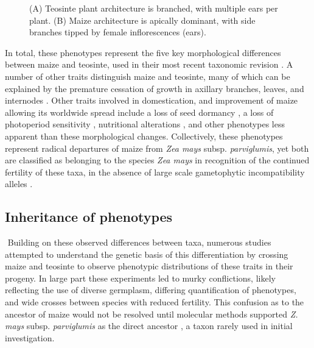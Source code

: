 \documentclass[a4paper]{article}
\newcommand{\mcs}[1]{\todo[size=\tiny, color=magenta!20]{#1}}
\begin{document}
   \begin{figure}
        \caption{\label{fig:provance} (A) Teosinte plant architecture is branched, with multiple ears per plant. (B) Maize architecture is apically dominant, with side branches tipped by female inflorescences (ears). }
\end{figure}



﻿In total, these phenotypes represent the five key morphological differences between maize and teosinte, used in their most recent taxonomic revision \citep{doebley1980, iltis1980}.
A number of other traits distinguish maize and teosinte, many of which can be explained by the premature cessation of growth in axillary branches, leaves, and internodes \citep{doebley1980}.
Other traits involved in domestication, and improvement of maize allowing its worldwide spread include a loss of seed dormancy \citep{avendanolopez2011}, a loss of photoperiod sensitivity \citep{huang2017}, nutritional alterations \citep{hanson1996, whitt2002}, and other phenotypes less apparent than these morphological changes. %
Collectively, these phenotypes represent radical departures of maize from \textit{Zea mays} subsp. \textit{parviglumis}, yet both are classified as belonging to the species \textit{Zea mays} in recognition of the continued fertility of these taxa, in the absence of large scale gametophytic incompatibility alleles \citep{kermicle2006}.


\subsection*{Inheritance of phenotypes}

﻿
﻿Building on these observed differences between taxa, numerous studies attempted to understand the genetic basis of this differentiation by crossing maize and teosinte to observe phenotypic distributions of these traits in their progeny.
In large part these experiments led to murky conflictions, likely reflecting the use of diverse germplasm, differing quantification of phenotypes, and wide crosses between species with reduced fertility.
This confusion as to the ancestor of maize would not be resolved until molecular methods supported \textit{Z. mays} subsp. \textit{parviglumis} as the direct ancestor \citep{bennetzen2001}, a taxon rarely used in initial investigation.
\end{document}
